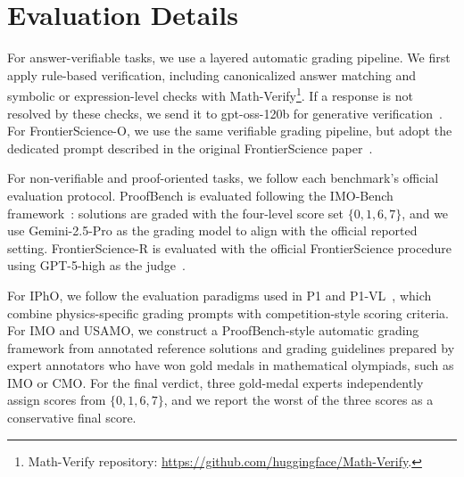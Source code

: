 \section{Evaluation Details}
\label{app:evaluation-details}

For answer-verifiable tasks, we use a layered automatic grading pipeline. We first apply rule-based verification, including canonicalized answer matching and symbolic or expression-level checks with Math-Verify\footnote{Math-Verify repository: \url{https://github.com/huggingface/Math-Verify}.}. If a response is not resolved by these checks, we send it to gpt-oss-120b for generative verification~\citep{openai2025gptoss}. For FrontierScience-O, we use the same verifiable grading pipeline, but adopt the dedicated prompt described in the original FrontierScience paper~\citep{wang2026frontierscience}.

For non-verifiable and proof-oriented tasks, we follow each benchmark's official evaluation protocol. ProofBench is evaluated following the IMO-Bench framework~\citep{luong2025imobench}: solutions are graded with the four-level score set \(\{0,1,6,7\}\), and we use Gemini-2.5-Pro as the grading model to align with the official reported setting. FrontierScience-R is evaluated with the official FrontierScience procedure using GPT-5-high as the judge~\citep{wang2026frontierscience}.

For IPhO, we follow the evaluation paradigms used in P1 and P1-VL~\citep{chen2025p1,luo2026p1vl}, which combine physics-specific grading prompts with competition-style scoring criteria. For IMO and USAMO, we construct a ProofBench-style automatic grading framework from annotated reference solutions and grading guidelines prepared by expert annotators who have won gold medals in mathematical olympiads, such as IMO or CMO. For the final verdict, three gold-medal experts independently assign scores from \(\{0,1,6,7\}\), and we report the worst of the three scores as a conservative final score.

\clearpage

